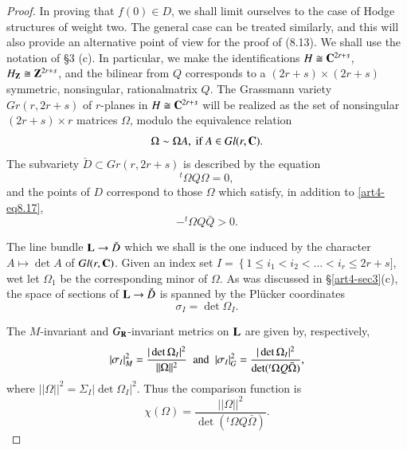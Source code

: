 \begin{proof}
In proving that $f(0) \in D$, we shall limit ourselves to the case of Hodge structures of weight two. The general case can be treated similarly, and this will also provide an alternative point of view for the proof of (8.13). We shall use the notation of \S 3 (c). In particular, we make the identifications $H \cong \mathbf{C}^{2r+s}$, $H_{\mathbf{Z}} \cong \mathbf{Z}^{2r+s}$, and the bilinear from $Q$ corresponds to a $(2r+s) \times (2r+s)$ symmetric, nonsingular, rational\pageoriginale matrix $Q$. The Grassmann variety $Gr (r, 2 r + s)$ of $r$-planes in $H \cong \mathbf{C}^{2r+s}$  will be realized as the set of nonsingular $(2r+s) \times r$ matrices $\Omega$, modulo the equivalence relation
\begin{equation}
\Omega \sim \Omega A, \text{ if } A \in G l (r, \mathbf{C}). 
\label{art4-eq8.16}
\end{equation}
The subvariety $\check{D} \subset Gr (r, 2r + s)$ is described by the equation
\begin{equation}
{}^t \Omega Q \Omega = 0, \label{art4-eq8.17}
\end{equation}
and the points of $D$ correspond to those $\Omega$ which satisfy, in addition to \eqref{art4-eq8.17},
\begin{equation}
-^t \Omega Q \bar{Q} >0. \label{art4-eq8.18}
\end{equation}

The line bundle $\mathbf{L} \to \check{D}$ which we shall is the one induced by the character $A \longmapsto \det A$ of $Gl(r,\mathbf{C})$. Given an index set $I = \left\{1 \leqslant i_1 < i_2 < \ldots < i_r \leqslant 2r + s \right. ]$, wet let $\Omega_1$ be the corresponding minor of $\Omega$. As was discussed in \S \ref{art4-sec3}(c), the space of sections of $\mathbf{L} \to \check{D}$ is spanned by the Pl\"{u}cker coordinates
$$
\sigma_I = \det \Omega_I.
$$

The $M$-invariant and $G_{\mathbf{R}}$-invariant metrics on $\mathbf{L}$ are given by, respectively,
$$
|\sigma_I|^2_M = \frac{|\det \Omega_I|^2}{||\Omega||^2} \text{\; and \;} |\sigma_I|^2_G = \frac{|\det \Omega_I|^2}{\det ({}^t \Omega Q \bar{\Omega})},
$$
where $||\Omega||^2 = \Sigma_I |\det \Omega_I|^2$. Thus the comparison function is 
\begin{equation}
\chi(\Omega) = \frac{||\Omega||^2}{\det ({}^t \Omega Q \bar{\Omega})}.
\label{art4-eq8.19}
\end{equation}


\end{proof}

